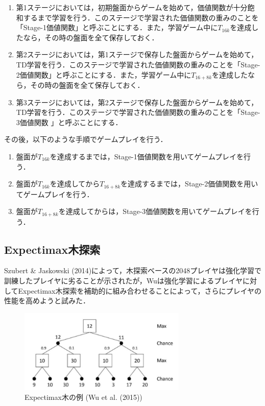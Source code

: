 \documentclass{suribt}
\begin{document}
\begin{enumerate}
\item 第1ステージにおいては，初期盤面からゲームを始めて，価値関数が十分飽和するまで学習を行う．このステージで学習された価値関数の重みのことを「Stage-1価値関数」と呼ぶことにする．また，学習ゲーム中に$T_{16k}$を達成したなら，その時の盤面を全て保存しておく．
\item 第2ステージにおいては，第1ステージで保存した盤面からゲームを始めて，TD学習を行う．このステージで学習された価値関数の重みのことを「Stage-2価値関数」と呼ぶことにする．また，学習ゲーム中に$T_{16+8k}$を達成したなら，その時の盤面を全て保存しておく．
\item 第3ステージにおいては，第2ステージで保存した盤面からゲームを始めて，TD学習を行う．このステージで学習された価値関数の重みのことを「Stage-3価値関数
」と呼ぶことにする．
\end{enumerate}

その後，以下のような手順でゲームプレイを行う．

\begin{enumerate}
\item 盤面が$T_{16k}$を達成するまでは，Stage-1価値関数を用いてゲームプレイを行う．
\item 盤面が$T_{16k}$を達成してから$T_{16+8k}$を達成するまでは，Stage-2価値関数を用いてゲームプレイを行う．
\item 盤面が$T_{16+8k}$を達成してからは，Stage-3価値関数を用いてゲームプレイを行う．
\end{enumerate}

\subsection{Expectimax木探索}
Szubert \& Jaskowski (2014)によって，木探索ベースの2048プレイヤは強化学習で訓練したプレイヤに劣ることが示されたが，Wuは強化学習によるプレイヤに対してExpectimax木探索を補助的に組み合わせることによって，さらにプレイヤの性能を高めようと試みた．

\begin{figure}[H]
	\centering
	\includegraphics[width=8cm]{figure_003.png}
	\caption{Expectimax木の例 (Wu et al. (2015))}
\end{figure}
\end{document}
